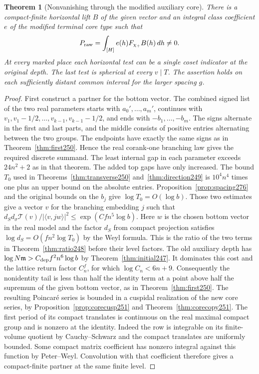 \documentclass[a4paper,11pt]{article}
\newtheorem{theorem}[proposition]{Theorem}
\theoremstyle{definition}
\theoremstyle{remark}
\numberwithin{equation}{section}
\begin{document}
\begin{theorem}[Nonvanishing through the modified auxiliary core]\leavevmode
\label{thm:raw276}
There is a compact-finite horizontal lift \(B\) of the given
vector and an integral class coefficient \(e\) of the modified
terminal core type such that
\[
       P_{\rm raw}=\int_{[H]}e(h)F_{\chi_+}B(h)\,dh\ne0 .
\]
At every marked place each horizontal test can be a single
coset indicator at the original depth. The last test is
spherical at every \(v\mid T\). The assertion holds on each
sufficiently distant common interval for the larger spacing \(g\).
\end{theorem}
\begin{proof}
First construct a partner for the bottom vector. The combined
signed list of the two real parameters starts with
\(a_0',\ldots,a_m'\), continues with
\(v_1,v_1-1/2,\ldots,v_{k-1},v_{k-1}-1/2\), and ends with
\(-b_1,\ldots,-b_m\). The signs alternate in the first and last
parts, and the middle consists of positive entries alternating
between the two groups. The endpoints have exactly the same
signs as in Theorem~\ref{thm:first250}. Hence the real
corank-one branching law gives the required discrete summand.
The least internal gap in each parameter exceeds \(24n^2+2\)
as in that theorem. The added top gaps have only increased.
The bound \(T_0\) used in Theorems~\ref{thm:transverse250}
and~\ref{thm:direction249} is \(10^4n^4\) times one plus an
upper bound on the absolute entries. Proposition~\ref{prop:spacing276}
and the original bounds on the \(b_j\) give \(\log T_0=O(\log b)\).
Those two estimates give a vector \(v\) for the branching
embedding \(j\) such that
\(d_S d_\sigma\mathcal T(v)/|\langle v,jw\rangle|^2
\le\exp(Cfn^5\log b)\). Here \(w\) is the chosen bottom
vector in the real model and the factor \(d_S\) from compact
projection satisfies \(\log d_S=O(fn^2\log T_0)\) by the Weyl
formula. This is the ratio of the two terms in
Theorem~\ref{thm:ratio248} before their level factors. The old auxiliary
depth has \(\log N\mathfrak m>C_{\rm dep} f^2n^6\log b\)
by Theorem~\ref{thm:initial247}. It dominates this cost and
the lattice return factor \(C_n^f\), for which
\(\log C_n<6n+9\). Consequently the nonidentity tail is less
than half the identity term at a point above half the supremum
of the given bottom vector, as in Theorem~\ref{thm:first250}.
The resulting Poincar\'e series is bounded in a cuspidal
realization of the new core series, by
Proposition~\ref{prop:corecusp251} and Theorem~\ref{thm:corecopy251}.
The first period of its compact translates is continuous on
the real maximal compact group and is nonzero at the identity.
Indeed the row is integrable on its finite-volume quotient
by Cauchy--Schwarz and the compact translates are uniformly
bounded. Some compact matrix coefficient has nonzero integral
against this function by Peter--Weyl. Convolution with that
coefficient therefore gives a compact-finite partner at the
same finite level.


\end{proof}
\end{document}
